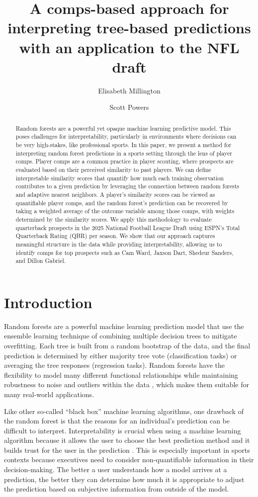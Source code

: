 \documentclass{article}
\title{A comps-based approach for interpreting tree-based predictions with an application to the NFL draft}
\author[1]{Elisabeth Millington}
\author[2]{Scott Powers}
\affil[1]{Department of Kinesiology, Rice University}
\affil[2]{Department of Sport Management, Rice University}
\begin{document}
\maketitle

\begin{abstract}
  Random forests are a powerful yet opaque machine learning predictive model. This poses challenges for interpretability, particularly in environments where decisions can be very high-stakes, like professional sports. In this paper, we present a method for interpreting random forest predictions in a sports setting through the lens of player comps. Player comps are a common practice in player scouting, where prospects are evaluated based on their perceived similarity to past players. We can define interpretable similarity scores that quantify how much each training observation contributes to a given prediction by leveraging the connection between random forests and adaptive nearest neighbors. A player’s similarity scores can be viewed as quantifiable player comps, and the random forest's prediction can be recovered by taking a weighted average of the outcome variable among those comps, with weights determined by the similarity scores. We apply this methodology to evaluate quarterback prospects in the 2025 National Football League Draft using ESPN’s Total Quarterback Rating (QBR) per season. We show that our approach captures meaningful structure in the data while providing interpretability, allowing us to identify comps for top prospects such as Cam Ward, Jaxson Dart, Shedeur Sanders, and Dillon Gabriel.
\end{abstract}

\section{Introduction}

Random forests are a powerful machine learning prediction model that use the ensemble learning technique of combining multiple decision trees to mitigate overfitting. Each tree is built from a random bootstrap of the data, and the final prediction is determined by either majority tree vote (classification tasks) or averaging the tree responses (regression tasks). Random forests have the flexibility to model many different functional relationships while maintaining robustness to noise and outliers within the data \citep{breiman_random_2001}, which makes them suitable for many real-world applications.

Like other so-called ``black box'' machine learning algorithms, one drawback of the random forest is that the reasons for an individual's prediction can be difficult to interpret. Interpretability is crucial when using a machine learning algorithm because it allows the user to choose the best prediction method and it builds trust for the user in the prediction \citep{ribeiro_why_2016}. This is especially important in sports contexts because executives need to consider non-quantifiable information in their decision-making. The better a user understands how a model arrives at a prediction, the better they can determine how much it is appropriate to adjust the prediction based on subjective information from outside of the model.
\end{document}
